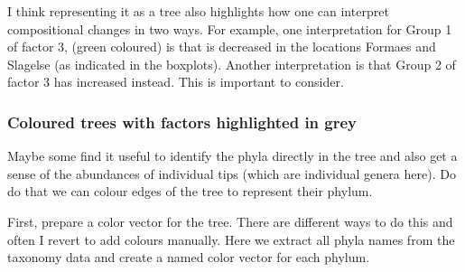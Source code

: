 \documentclass[
]{book}
\newenvironment{Shaded}{\begin{snugshade}}{\end{snugshade}}
\newcommand{\AttributeTok}[1]{\textcolor[rgb]{0.77,0.63,0.00}{#1}}
\newcommand{\CommentTok}[1]{\textcolor[rgb]{0.56,0.35,0.01}{\textit{#1}}}
\newcommand{\DecValTok}[1]{\textcolor[rgb]{0.00,0.00,0.81}{#1}}
\newcommand{\DocumentationTok}[1]{\textcolor[rgb]{0.56,0.35,0.01}{\textbf{\textit{#1}}}}
\newcommand{\FunctionTok}[1]{\textcolor[rgb]{0.00,0.00,0.00}{#1}}
\newcommand{\NormalTok}[1]{#1}
\newcommand{\OtherTok}[1]{\textcolor[rgb]{0.56,0.35,0.01}{#1}}
\newcommand{\SpecialCharTok}[1]{\textcolor[rgb]{0.00,0.00,0.00}{#1}}
\begin{document}
I think representing it as a tree also highlights how one can interpret compositional changes in two ways. For example, one interpretation for Group 1 of factor 3, (green coloured) is that is decreased in the locations Formaes and Slagelse (as indicated in the boxplots). Another interpretation is that Group 2 of factor 3 has increased instead. This is important to consider.

\hypertarget{coloured-trees-with-factors-highlighted-in-grey}{%
\subsubsection{Coloured trees with factors highlighted in grey}\label{coloured-trees-with-factors-highlighted-in-grey}}

Maybe some find it useful to identify the phyla directly in the tree and also get a sense of the abundances of individual tips (which are individual genera here). Do do that we can colour edges of the tree to represent their phylum.

First, prepare a color vector for the tree. There are different ways to do this and often I revert to add colours manually. Here we extract all phyla names from the taxonomy data and create a named color vector for each phylum.

\begin{Shaded}
\end{Shaded}
\end{document}
